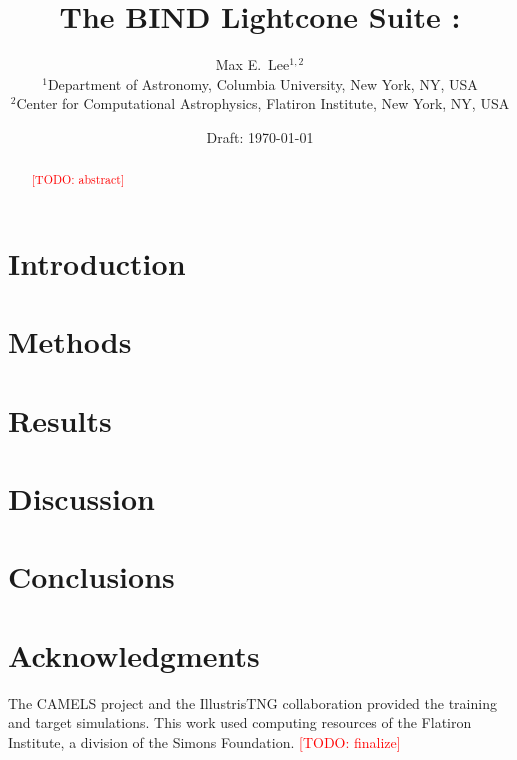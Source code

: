 \documentclass[11pt]{article}
\title{The BIND Lightcone Suite \todo{N}: \todo{title}}
\author{%
  Max E.\ Lee$^{1,2}$ \todo{author list to be finalized}\\[2pt]
  \small $^1$Department of Astronomy, Columbia University, New York, NY, USA\\
  \small $^2$Center for Computational Astrophysics, Flatiron Institute, New York, NY, USA
}
\date{Draft: \today}
\newcommand{\todo}[1]{\textcolor{red}{[TODO: #1]}}
\begin{document}
\maketitle

\begin{abstract}
\todo{abstract}
\end{abstract}

\section{Introduction}\label{sec:intro}

\section{Methods}\label{sec:methods}

\section{Results}\label{sec:results}

\section{Discussion}\label{sec:discussion}

\section{Conclusions}\label{sec:conclusions}

\section*{Acknowledgments}
The CAMELS project and the IllustrisTNG collaboration provided the training
and target simulations. This work used computing resources of the Flatiron
Institute, a division of the Simons Foundation. \todo{finalize}



\end{document}
